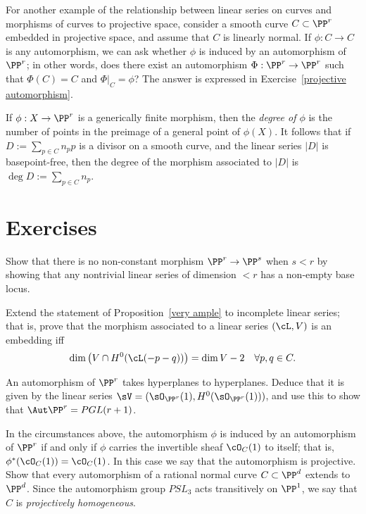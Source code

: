 For another example of the relationship between linear series on curves and morphisms of curves to projective space, consider a smooth curve $C \subset \PP^r$ embedded in projective space, and assume that $C$ is linearly normal. If $\phi : C \to C$ is any automorphism, we can ask whether $\phi$ is induced by an automorphism of $\PP^r$; in other words, does there exist an automorphism $\Phi : \PP^r \to \PP^r$ such that $\Phi(C) = C$ and $\Phi|_C = \phi$? The answer is expressed in Exercise~\ref{projective automorphism}.


If $\phi:X \to \PP^r$ is a generically finite morphism, then the \emph{degree of $\phi$} is the number of points in the preimage of a general point of $\phi(X)$. It follows that if $D := \sum_{p\in C} n_pp$ is a divisor on a smooth curve, and the linear series $|D|$ is basepoint-free, then the degree of the morphism associated to $|D|$ is $\deg D := \sum_{p\in C} n_p$.

\section{Exercises}

\begin{exercise}\label{here there be basepoints}
 Show that there is no non-constant morphism $\PP^r\to \PP^s$ when $s<r$ by showing that any nontrivial linear
 series of dimension $<r$ has a non-empty base locus.
\end{exercise}

\begin{exercise}
Extend the statement of Proposition~\ref{very ample} to incomplete linear series; that is, prove that the morphism associated to a linear series $(\cL, V)$ is an embedding iff
$$
\dim\big( V \cap H^0(\cL(-p-q))\big) = \dim V - 2 \quad \forall p, q \in C.
$$
\end{exercise}

\begin{exercise}
An automorphism of $\PP^r$ takes hyperplanes to hyperplanes. Deduce that it is given by the linear series
$\sV = (\sO_{\PP^r}(1), H^0(\sO_{\PP^r}(1)))$, and use this to show that $\Aut \PP^r = PGL(r+1)$. 
\end{exercise}

\begin{exercise}\label{projective automorphism}
In the circumstances above, the automorphism $\phi$ is induced by an automorphism of $\PP^r$ if and only if $\phi$ carries the invertible sheaf $\cO_{C}(1)$ to itself; that is, $\phi^*(\cO_{C}(1)) = \cO_{C}(1)$. In this case we say that the automorphism
is projective. Show that every automorphism of a rational normal curve $C \subset \PP^d$  extends to $\PP^d$. Since the
automorphism group $PSL_3$ acts transitively on $\PP^1$, we say that
$C$ is \emph{projectively homogeneous}.


\end{exercise}

